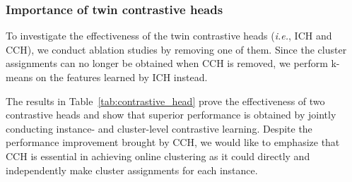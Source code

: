 \subsubsection{Importance of twin contrastive heads}

To investigate the effectiveness of the twin contrastive heads (\textit{i.e.}, ICH and CCH), we conduct ablation studies by removing one of them. Since the cluster assignments can no longer be obtained when CCH is removed, we perform k-means on the features learned by ICH instead.

\begin{table}[h!]
\centering
\caption{Effectiveness of two contrastive heads.}
\label{tab:contrastive_head}
\end{table}

The results in Table~\ref{tab:contrastive_head} prove the effectiveness of two contrastive heads and show that superior performance is obtained by jointly conducting instance- and cluster-level contrastive learning. Despite the performance improvement brought by CCH, we would like to emphasize that CCH is essential in achieving online clustering as it could directly and independently make cluster assignments for each instance.

